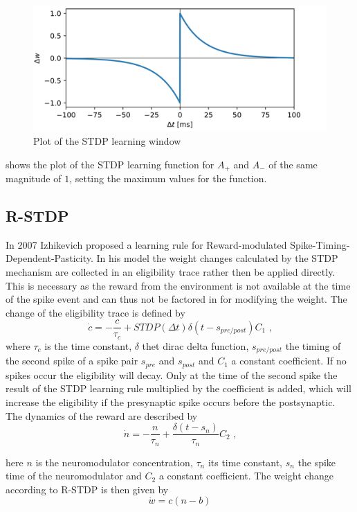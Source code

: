 \begin{figure}[htpb]
  \centering
  \includegraphics[width = \textwidth]{figures/STDPcurve.png}
  \caption{Plot of the STDP learning window}
  \label{fig:STDP}
\end{figure}

shows the plot of the STDP learning function for $A_+$ and $A_-$ of the same magnitude of $1$, setting the maximum values for the function.

\subsection{R-STDP}
In 2007 Izhikevich proposed a learning rule for Reward-modulated Spike-Timing-Dependent-Pasticity.  In his model the weight changes calculated by the STDP mechanism are collected in an eligibility trace rather then be applied directly. This is necessary as the reward from the environment is not available at the time of the spike event and can thus not be factored in for modifying the weight. The change of the eligibility trace is defined by
\begin{equation}
  \dot{c} = - \frac{c}{\tau_c} + STDP(\Delta t) \delta(t-s_{pre/post})C_1 \text{ ,}
\end{equation}
where $\tau_c$ is the time constant, $\delta$ thet dirac delta function, $s_{pre/post}$ the timing of the second spike of a spike pair $s_{pre}$ and $s_{post}$ and $C_1$ a constant coefficient. If no spikes occur the eligibility will decay. Only at the time of the second spike the result of the STDP learning rule multiplied by the coefficient is added, which will increase the eligibility if the presynaptic spike occurs before the postsynaptic. The dynamics of the reward are described by
\begin{equation}
  \dot{n}=-\frac{n}{\tau_n} + \frac{\delta(t-s_n)}{\tau_n}C_2 \text{ ,}
\end{equation}

here $n$ is the neuromodulator concentration, $\tau_n$ its time constant, $s_n$ the spike time of the neuromodulator and $C_2$ a constant coefficient.
The weight change according to R-STDP is then given by
\begin{equation} \label{eq:dWrStdp}
\dot{w}=c(n-b)
\end{equation}

